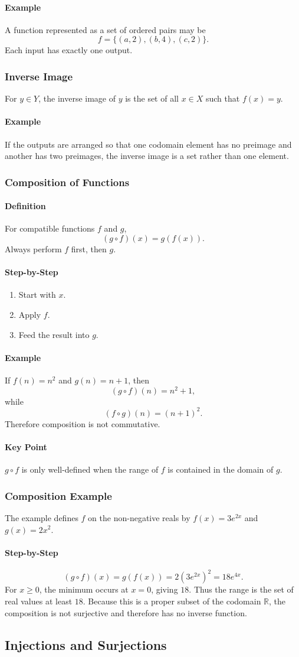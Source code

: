 \documentclass[12pt]{article}
\newcommand{\Definition}{\paragraph{Definition}}
\newcommand{\Step}{\paragraph{Step-by-Step}}
\newcommand{\Example}{\paragraph{Example}}
\newcommand{\KeyPoint}{\paragraph{Key Point}}
\begin{document}
\Example A function represented as a set of ordered pairs may be
\[
f=\{(a,2),(b,4),(c,2)\}.
\]
Each input has exactly one output.

\subsubsection{Inverse Image}
For $y\in Y$, the inverse image of $y$ is the set of all $x\in X$ such that $f(x)=y$.

\Example If the outputs are arranged so that one codomain element has no preimage and another has two preimages, the inverse image is a set rather than one element.

\subsubsection{Composition of Functions}
\Definition For compatible functions $f$ and $g$,
\[
(g\circ f)(x)=g(f(x)).
\]
Always perform $f$ first, then $g$.

\Step
\begin{enumerate}
    \item Start with $x$.
    \item Apply $f$.
    \item Feed the result into $g$.
\end{enumerate}

\Example If $f(n)=n^2$ and $g(n)=n+1$, then
\[
(g\circ f)(n)=n^2+1,
\]
while
\[
(f\circ g)(n)=(n+1)^2.
\]
Therefore composition is not commutative.

\KeyPoint $g\circ f$ is only well-defined when the range of $f$ is contained in the domain of $g$.

\subsubsection{Composition Example}
The example defines $f$ on the non-negative reals by $f(x)=3e^{2x}$ and $g(x)=2x^2$.

\Step
\[
(g\circ f)(x)=g(f(x))=2(3e^{2x})^2=18e^{4x}.
\]
For $x\ge0$, the minimum occurs at $x=0$, giving $18$. Thus the range is the set of real values at least $18$. Because this is a proper subset of the codomain $\mathbb R$, the composition is not surjective and therefore has no inverse function.

\subsection{Injections and Surjections}
\end{document}
